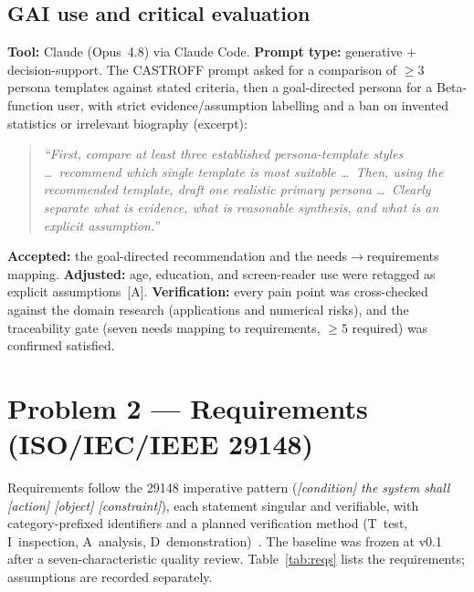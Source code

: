 \documentclass[11pt,a4paper]{article}
\begin{document}
\subsection{GAI use and critical evaluation}
\textbf{Tool:} Claude (Opus~4.8) via Claude Code. \textbf{Prompt type:} generative +
decision-support. The CASTROFF prompt asked for a comparison of $\ge 3$ persona templates
against stated criteria, then a goal-directed persona for a Beta-function user, with
strict evidence/assumption labelling and a ban on invented statistics or irrelevant
biography (excerpt):
\begin{quote}\small\itshape
``First, compare at least three established persona-template styles \ldots\ recommend which
single template is most suitable \ldots\ Then, using the recommended template, draft one
realistic primary persona \ldots\ Clearly separate what is evidence, what is reasonable
synthesis, and what is an explicit assumption.''
\end{quote}
\textbf{Accepted:} the goal-directed recommendation and the needs$\rightarrow$requirements
mapping. \textbf{Adjusted:} age, education, and screen-reader use were retagged as
explicit assumptions~[A]. \textbf{Verification:} every pain point was cross-checked
against the domain research (applications and numerical risks), and the traceability gate
(seven needs mapping to requirements, $\ge 5$ required) was confirmed satisfied.

\section{Problem 2 --- Requirements (ISO/IEC/IEEE 29148)}
\label{sec:p2}

Requirements follow the 29148 imperative pattern
(\emph{[condition] the system shall [action] [object] [constraint]}), each statement
singular and verifiable, with category-prefixed identifiers and a planned verification
method (T~test, I~inspection, A~analysis, D~demonstration)~\cite{iso29148}. The baseline
was frozen at v0.1 after a seven-characteristic quality review. Table~\ref{tab:reqs}
lists the requirements; assumptions are recorded separately.
\end{document}
